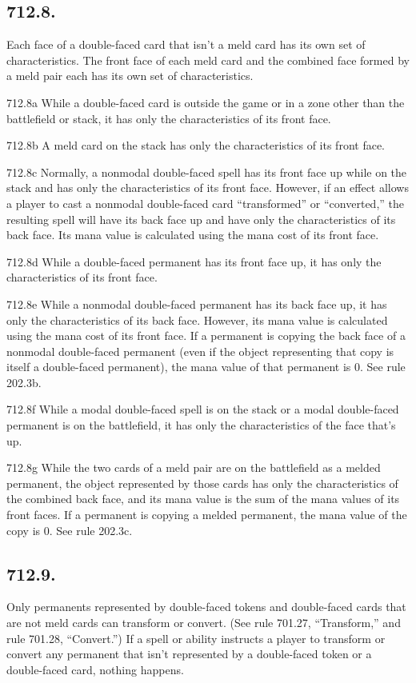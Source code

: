 \subsection*{712.8.}
Each face of a double-faced card that isn’t a meld card has its own set of characteristics. The front face of each meld card and the combined face formed by a meld pair each has its own set of characteristics.

712.8a While a double-faced card is outside the game or in a zone other than the battlefield or stack, it has only the characteristics of its front face.

712.8b A meld card on the stack has only the characteristics of its front face.

712.8c Normally, a nonmodal double-faced spell has its front face up while on the stack and has only the characteristics of its front face. However, if an effect allows a player to cast a nonmodal double-faced card “transformed” or “converted,” the resulting spell will have its back face up and have only the characteristics of its back face. Its mana value is calculated using the mana cost of its front face.

712.8d While a double-faced permanent has its front face up, it has only the characteristics of its front face.

712.8e While a nonmodal double-faced permanent has its back face up, it has only the characteristics of its back face. However, its mana value is calculated using the mana cost of its front face. If a permanent is copying the back face of a nonmodal double-faced permanent (even if the object representing that copy is itself a double-faced permanent), the mana value of that permanent is 0. See rule 202.3b.

712.8f While a modal double-faced spell is on the stack or a modal double-faced permanent is on the battlefield, it has only the characteristics of the face that’s up.

712.8g While the two cards of a meld pair are on the battlefield as a melded permanent, the object represented by those cards has only the characteristics of the combined back face, and its mana value is the sum of the mana values of its front faces. If a permanent is copying a melded permanent, the mana value of the copy is 0. See rule 202.3c.

\subsection*{712.9.}
Only permanents represented by double-faced tokens and double-faced cards that are not meld cards can transform or convert. (See rule 701.27, “Transform,” and rule 701.28, “Convert.”) If a spell or ability instructs a player to transform or convert any permanent that isn’t represented by a double-faced token or a double-faced card, nothing happens.

